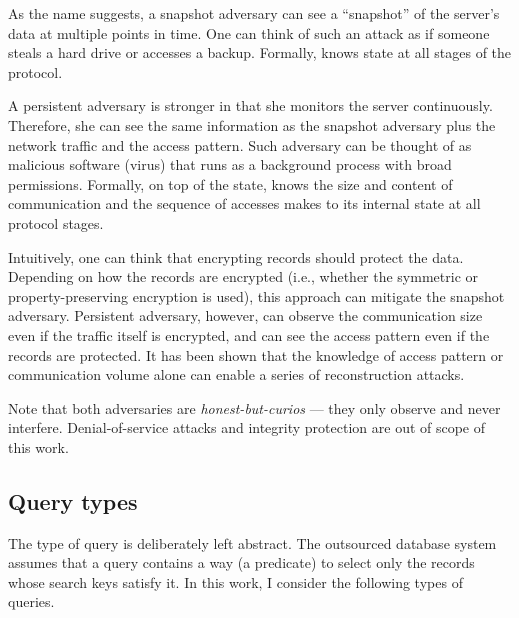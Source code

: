 			As the name suggests, a snapshot adversary can see a ``snapshot'' of the server's data at multiple points in time.
			One can think of such an attack as if someone steals a hard drive or accesses a backup.
			Formally, \adversary{} knows \server{} state at all stages of the protocol.

			A persistent adversary is stronger in that she monitors the server continuously.
			Therefore, she can see the same information as the snapshot adversary plus the network traffic and the access pattern.
			Such adversary can be thought of as malicious software (virus) that runs as a background process with broad permissions.
			Formally, on top of the \server{} state, \adversary{} knows the size and content of \server{} communication and the sequence of accesses \server{} makes to its internal state at all protocol stages.

			Intuitively, one can think that encrypting records should protect the data.
			Depending on how the records are encrypted (i.e., whether the symmetric or property-preserving encryption is used), this approach can mitigate the snapshot adversary.
			Persistent adversary, however, can observe the communication size even if the traffic itself is encrypted, and can see the access pattern even if the records are protected.
			It has been shown that the knowledge of access pattern \cite{multidimensional-range-queries, inference-attack-islam-14, leakage-abuse-attacks-cash-15, inference-attacks-naveed-15, generic-attacks-kellaris, attacks-tao-of-inference, grubbs-attacks, access-pattern-disclosure, attacks-improved-reconstruction} or communication volume \cite{generic-attacks-kellaris, state-of-uniform, attacks-improved-reconstruction, pump-volume-attacks, volume-range-attacks} alone can enable a series of reconstruction attacks.

			Note that both adversaries are \emph{honest-but-curios} --- they only observe and never interfere.
			Denial-of-service attacks and integrity protection are out of scope of this work.

		\subsection{Query types}

			The type of query \query{} is deliberately left abstract.
			The outsourced database system assumes that a query contains a way (a predicate) to select only the records whose search keys satisfy it.
			In this work, I consider the following types of queries.

